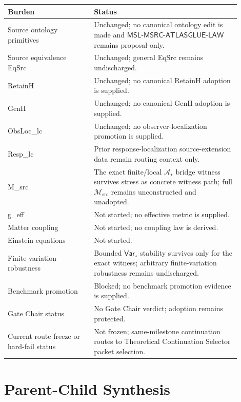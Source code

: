 \documentclass[11pt]{article}
\newcommand{\Msrc}{\mathcal{M}_{\mathrm{src}}}
\newcommand{\MSL}{\mathsf{MSL}\mbox{-}\mathsf{MSRC}\mbox{-}\mathsf{ATLASGLUE}\mbox{-}\mathsf{LAW}}
\newcommand{\Astar}{\mathcal A_{\star}}
\newcommand{\Varstar}{\mathsf{Var}_{\star}}
\begin{document}
\begin{center}
\begin{tabular}{p{0.33\linewidth}p{0.57\linewidth}}
\hline
Burden & Status \\
\hline
Source ontology primitives & Unchanged; no canonical ontology edit is made and \(\MSL\) remains proposal-only. \\
Source equivalence EqSrc & Unchanged; general EqSrc remains undischarged. \\
RetainH & Unchanged; no canonical RetainH adoption is supplied. \\
GenH & Unchanged; no canonical GenH adoption is supplied. \\
ObsLoc\_lc & Unchanged; no observer-localization promotion is supplied. \\
Resp\_lc & Prior response-localization source-extension data remain routing context only. \\
M\_src & The exact finite/local \(\Astar\) bridge witness survives stress as concrete witness path; full \(\Msrc\) remains unconstructed and unadopted. \\
g\_eff & Not started; no effective metric is supplied. \\
Matter coupling & Not started; no coupling law is derived. \\
Einstein equations & Not started. \\
Finite-variation robustness & Bounded \(\Varstar\) stability survives only for the exact witness; arbitrary finite-variation robustness remains undischarged. \\
Benchmark promotion & Blocked; no benchmark promotion evidence is supplied. \\
Gate Chair status & No Gate Chair verdict; adoption remains protected. \\
Current route freeze or hard-fail status & Not frozen; same-milestone continuation routes to Theoretical Continuation Selector packet selection. \\
\hline
\end{tabular}
\end{center}

\section{Parent-Child Synthesis}
\end{document}
